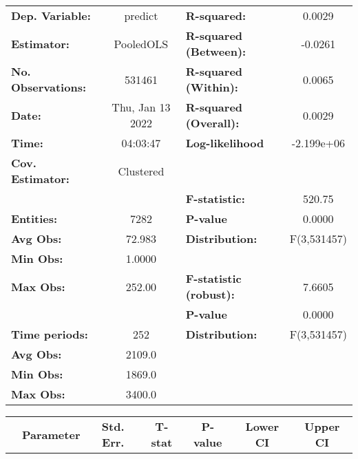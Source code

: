 \begin{center}
\begin{tabular}{lclc}
\toprule
\textbf{Dep. Variable:}    &      predict       & \textbf{  R-squared:         }   &      0.0029      \\
\textbf{Estimator:}        &     PooledOLS      & \textbf{  R-squared (Between):}  &     -0.0261      \\
\textbf{No. Observations:} &       531461       & \textbf{  R-squared (Within):}   &      0.0065      \\
\textbf{Date:}             &  Thu, Jan 13 2022  & \textbf{  R-squared (Overall):}  &      0.0029      \\
\textbf{Time:}             &      04:03:47      & \textbf{  Log-likelihood     }   &    -2.199e+06    \\
\textbf{Cov. Estimator:}   &     Clustered      & \textbf{                     }   &                  \\
\textbf{}                  &                    & \textbf{  F-statistic:       }   &      520.75      \\
\textbf{Entities:}         &        7282        & \textbf{  P-value            }   &      0.0000      \\
\textbf{Avg Obs:}          &       72.983       & \textbf{  Distribution:      }   &   F(3,531457)    \\
\textbf{Min Obs:}          &       1.0000       & \textbf{                     }   &                  \\
\textbf{Max Obs:}          &       252.00       & \textbf{  F-statistic (robust):} &      7.6605      \\
\textbf{}                  &                    & \textbf{  P-value            }   &      0.0000      \\
\textbf{Time periods:}     &        252         & \textbf{  Distribution:      }   &   F(3,531457)    \\
\textbf{Avg Obs:}          &       2109.0       & \textbf{                     }   &                  \\
\textbf{Min Obs:}          &       1869.0       & \textbf{                     }   &                  \\
\textbf{Max Obs:}          &       3400.0       & \textbf{                     }   &                  \\
\bottomrule
\end{tabular}
\begin{tabular}{lcccccc}
                & \textbf{Parameter} & \textbf{Std. Err.} & \textbf{T-stat} & \textbf{P-value} & \textbf{Lower CI} & \textbf{Upper CI}  \\

\end{tabular}
\end{center}
